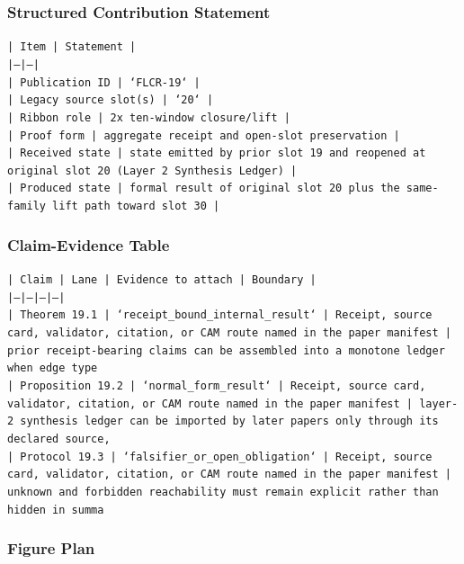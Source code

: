 \documentclass[11pt]{article}
\begin{document}
\subsubsection*{Structured Contribution Statement}

\noindent\texttt{| Item | Statement |}\\
\noindent\texttt{|---|---|}\\
\noindent\texttt{| Publication ID | `FLCR-19` |}\\
\noindent\texttt{| Legacy source slot(s) | `20` |}\\
\noindent\texttt{| Ribbon role | 2x ten-window closure/lift |}\\
\noindent\texttt{| Proof form | aggregate receipt and open-slot preservation |}\\
\noindent\texttt{| Received state | state emitted by prior slot 19 and reopened at original slot 20 (Layer 2 Synthesis Ledger) |}\\
\noindent\texttt{| Produced state | formal result of original slot 20 plus the same-family lift path toward slot 30 |}\\

\subsubsection*{Claim-Evidence Table}

\noindent\texttt{| Claim | Lane | Evidence to attach | Boundary |}\\
\noindent\texttt{|---|---|---|---|}\\
\noindent\texttt{| Theorem 19.1 | `receipt\_bound\_internal\_result` | Receipt, source card, validator, citation, or CAM route named in the paper manifest | prior receipt-bearing claims can be assembled into a monotone ledger when edge type}\\
\noindent\texttt{| Proposition 19.2 | `normal\_form\_result` | Receipt, source card, validator, citation, or CAM route named in the paper manifest | layer-2 synthesis ledger can be imported by later papers only through its declared source,}\\
\noindent\texttt{| Protocol 19.3 | `falsifier\_or\_open\_obligation` | Receipt, source card, validator, citation, or CAM route named in the paper manifest | unknown and forbidden reachability must remain explicit rather than hidden in summa}\\

\subsubsection*{Figure Plan}
\end{document}
